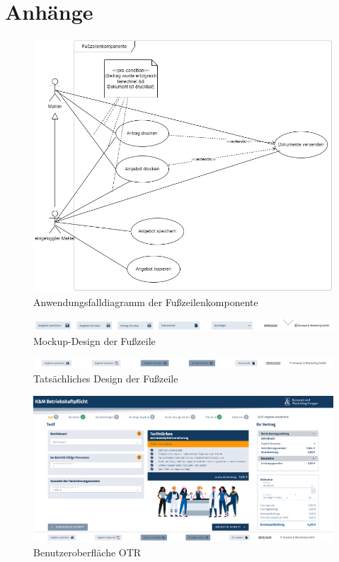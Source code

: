 \appendix

\section{Anhänge}

\begin{figure}[!htbp]
	\includegraphics[width=\textwidth, height=\textheight, keepaspectratio]{anhang/usecase_footer.png}
	\caption{Anwendungsfalldiagramm der Fußzeilenkomponente}
	\label{usecasefooter}
\end{figure}
\begin{figure}[!htbp]
	\includegraphics[width=\textwidth, height=\textheight, keepaspectratio]{anhang/mockup_footer.png}
	\caption{Mockup-Design der Fußzeile}
	\label{mockup}
\end{figure}
\begin{figure}[!htbp]
	\includegraphics[width=\textwidth, height=\textheight, keepaspectratio]{anhang/actual_footer.png}
	\caption{Tatsächliches Design der Fußzeile}
	\label{actualfooter}
\end{figure}
\begin{figure}[!htbp]
	\includegraphics[width=\textwidth,  keepaspectratio]{anhang/otr.png}
	\caption{Benutzeroberfläche OTR}
	\label{otr_figure}
\end{figure}